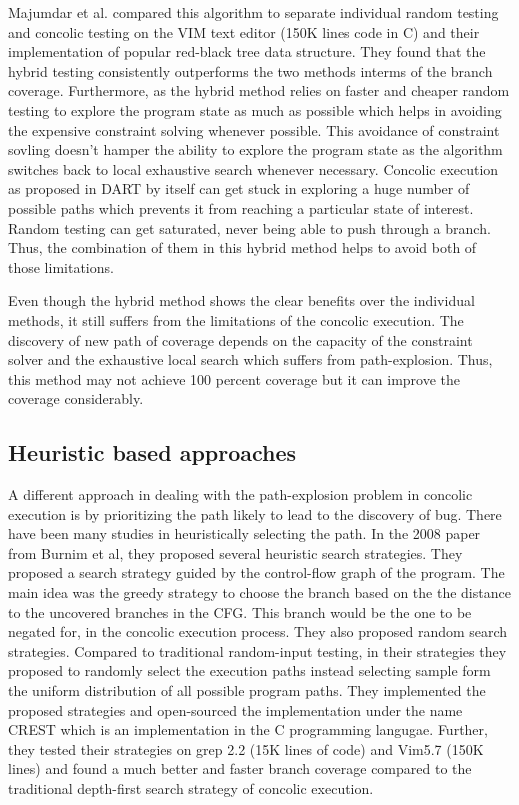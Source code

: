 \documentclass[	runningheads,
				a4paper]{llncs}
\begin{document}
Majumdar et al. \cite{majumdar2007hybrid} compared this algorithm to separate individual random testing and concolic testing on the VIM text editor (150K lines code in C) and their implementation of popular red-black tree data structure. They found that the hybrid testing consistently outperforms the two methods interms of the branch coverage. Furthermore, as the hybrid method relies on faster and cheaper random testing to explore the program state as much as possible which helps in avoiding the expensive constraint solving whenever possible. This avoidance of constraint sovling doesn't hamper the ability to explore the program state as the algorithm switches back to local exhaustive search whenever necessary. Concolic execution as proposed in DART \cite{godefroid2005dart} by itself can get stuck in exploring a huge number of possible paths which prevents it from reaching a particular state of interest. Random testing can get saturated, never being able to push through a branch. Thus, the combination of them in this hybrid method helps to avoid both of those limitations. 

Even though the hybrid method shows the clear benefits over the individual methods, it still suffers from the limitations of the concolic execution. The discovery of new path of coverage depends on the capacity of the constraint solver and the exhaustive local search which suffers from path-explosion. Thus, this method may not achieve 100 percent coverage but it can improve the coverage considerably.


\subsection{Heuristic based approaches}
A different approach in dealing with the path-explosion problem in concolic execution is by prioritizing the path likely to lead to the discovery of bug. There have been many studies in heuristically selecting the path. In the 2008 paper \cite{kousik2008heuristic} from Burnim et al, they proposed several heuristic search strategies. They proposed a search strategy guided by the control-flow graph of the program. The main idea was the greedy strategy to choose the branch based on the the distance to the uncovered branches in the CFG. This branch would be the one to be negated for, in the concolic execution process. They also proposed random search strategies. Compared to traditional random-input testing, in their strategies they proposed to randomly select the execution paths instead selecting sample form the uniform distribution of all possible program paths. They implemented the proposed strategies and open-sourced the implementation under the name CREST which is an implementation in the C programming langugae. Further, they tested their strategies on grep 2.2 (15K lines of code) and Vim5.7 (150K lines) and found a much better and faster branch coverage compared to the traditional depth-first search strategy of concolic execution. 
\end{document}
